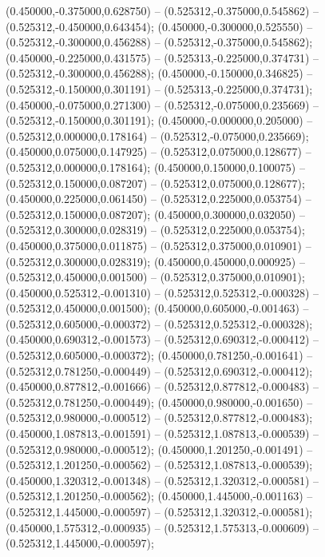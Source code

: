  (0.450000,-0.375000,0.628750) -- (0.525312,-0.375000,0.545862) -- (0.525312,-0.450000,0.643454);
 (0.450000,-0.300000,0.525550) -- (0.525312,-0.300000,0.456288) -- (0.525312,-0.375000,0.545862);
 (0.450000,-0.225000,0.431575) -- (0.525313,-0.225000,0.374731) -- (0.525312,-0.300000,0.456288);
 (0.450000,-0.150000,0.346825) -- (0.525312,-0.150000,0.301191) -- (0.525313,-0.225000,0.374731);
 (0.450000,-0.075000,0.271300) -- (0.525312,-0.075000,0.235669) -- (0.525312,-0.150000,0.301191);
 (0.450000,-0.000000,0.205000) -- (0.525312,0.000000,0.178164) -- (0.525312,-0.075000,0.235669);
 (0.450000,0.075000,0.147925) -- (0.525312,0.075000,0.128677) -- (0.525312,0.000000,0.178164);
 (0.450000,0.150000,0.100075) -- (0.525312,0.150000,0.087207) -- (0.525312,0.075000,0.128677);
 (0.450000,0.225000,0.061450) -- (0.525312,0.225000,0.053754) -- (0.525312,0.150000,0.087207);
 (0.450000,0.300000,0.032050) -- (0.525312,0.300000,0.028319) -- (0.525312,0.225000,0.053754);
 (0.450000,0.375000,0.011875) -- (0.525312,0.375000,0.010901) -- (0.525312,0.300000,0.028319);
 (0.450000,0.450000,0.000925) -- (0.525312,0.450000,0.001500) -- (0.525312,0.375000,0.010901);
 (0.450000,0.525312,-0.001310) -- (0.525312,0.525312,-0.000328) -- (0.525312,0.450000,0.001500);
 (0.450000,0.605000,-0.001463) -- (0.525312,0.605000,-0.000372) -- (0.525312,0.525312,-0.000328);
 (0.450000,0.690312,-0.001573) -- (0.525312,0.690312,-0.000412) -- (0.525312,0.605000,-0.000372);
 (0.450000,0.781250,-0.001641) -- (0.525312,0.781250,-0.000449) -- (0.525312,0.690312,-0.000412);
 (0.450000,0.877812,-0.001666) -- (0.525312,0.877812,-0.000483) -- (0.525312,0.781250,-0.000449);
 (0.450000,0.980000,-0.001650) -- (0.525312,0.980000,-0.000512) -- (0.525312,0.877812,-0.000483);
 (0.450000,1.087813,-0.001591) -- (0.525312,1.087813,-0.000539) -- (0.525312,0.980000,-0.000512);
 (0.450000,1.201250,-0.001491) -- (0.525312,1.201250,-0.000562) -- (0.525312,1.087813,-0.000539);
 (0.450000,1.320312,-0.001348) -- (0.525312,1.320312,-0.000581) -- (0.525312,1.201250,-0.000562);
 (0.450000,1.445000,-0.001163) -- (0.525312,1.445000,-0.000597) -- (0.525312,1.320312,-0.000581);
 (0.450000,1.575312,-0.000935) -- (0.525312,1.575313,-0.000609) -- (0.525312,1.445000,-0.000597);
